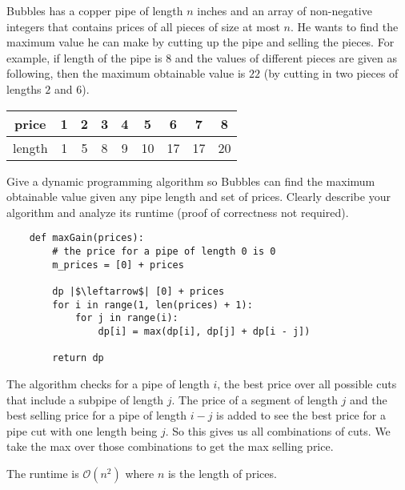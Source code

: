 \documentclass{article}
\begin{document}
Bubbles has a copper pipe of length $n$ inches and an array of non-negative integers that contains prices of all pieces of size at most $n$. He wants to find the maximum value he can make by cutting up the pipe and selling the pieces. For example, if length of the pipe is $8$ and the values of different pieces are given as following, then the maximum obtainable value is $22$ (by cutting in two pieces of lengths $2$ and $6$).
    \begin{center}
        \begin{tabular}{ c c c c c c c c c }
            \hline price  & 1 & 2 & 3 & 4 & 5  & 6  & 7  & 8  \\
            \hline length & 1 & 5 & 8 & 9 & 10 & 17 & 17 & 20   
        \end{tabular}
    \end{center}
Give a dynamic programming algorithm so Bubbles can find the maximum obtainable value given any pipe length and set of prices. Clearly describe your algorithm and analyze its runtime (proof of correctness not required).
    \begin{answer}
        \begin{verbatim}
    def maxGain(prices):
        # the price for a pipe of length 0 is 0
        m_prices = [0] + prices

        dp |$\leftarrow$| [0] + prices
        for i in range(1, len(prices) + 1):
            for j in range(i):
                dp[i] = max(dp[i], dp[j] + dp[i - j])

        return dp
        \end{verbatim}
        The algorithm checks for a pipe of length $i$, the best price over all possible cuts that include a subpipe of length $j$. The price of a segment of length $j$ and the best selling price for a pipe of length $i - j$ is added to see the best price for a pipe cut with one length being $j$. So this gives us all combinations of cuts. We take the max over those combinations to get the max selling price.

        The runtime is $\mathcal{O}(n^{2})$ where $n$ is the length of prices.
    \end{answer}
\end{document}
